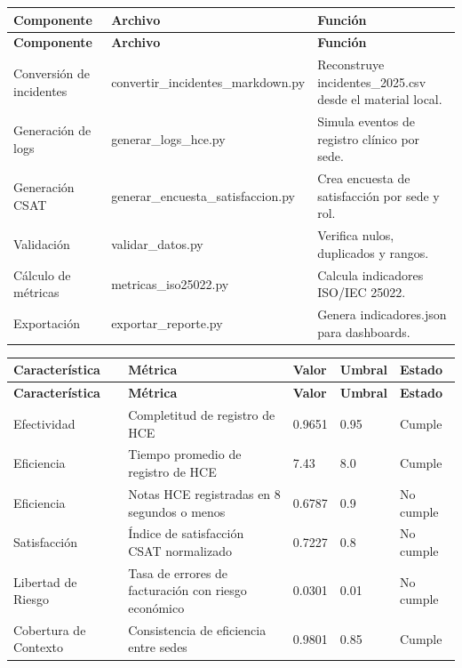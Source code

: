 \documentclass[11pt]{article}
\begin{document}
\small
\begin{longtable}{p{} p{} p{}}
\toprule
\textbf{Componente} & \textbf{Archivo} & \textbf{Función} \\
\midrule
\endfirsthead
\toprule
\textbf{Componente} & \textbf{Archivo} & \textbf{Función} \\
\midrule
\endhead
Conversión de incidentes & convertir\_incidentes\_markdown.py & Reconstruye incidentes\_2025.csv desde el material local. \\
Generación de logs & generar\_logs\_hce.py & Simula eventos de registro clínico por sede. \\
Generación CSAT & generar\_encuesta\_satisfaccion.py & Crea encuesta de satisfacción por sede y rol. \\
Validación & validar\_datos.py & Verifica nulos, duplicados y rangos. \\
Cálculo de métricas & metricas\_iso25022.py & Calcula indicadores ISO/IEC 25022. \\
Exportación & exportar\_reporte.py & Genera indicadores.json para dashboards. \\
\bottomrule
\end{longtable}
\normalsize


\small
\begin{longtable}{p{} p{} p{} p{} p{}}
\toprule
\textbf{Característica} & \textbf{Métrica} & \textbf{Valor} & \textbf{Umbral} & \textbf{Estado} \\
\midrule
\endfirsthead
\toprule
\textbf{Característica} & \textbf{Métrica} & \textbf{Valor} & \textbf{Umbral} & \textbf{Estado} \\
\midrule
\endhead
Efectividad & Completitud de registro de HCE & 0.9651 & 0.95 & Cumple \\
Eficiencia & Tiempo promedio de registro de HCE & 7.43 & 8.0 & Cumple \\
Eficiencia & Notas HCE registradas en 8 segundos o menos & 0.6787 & 0.9 & No cumple \\
Satisfacción & Índice de satisfacción CSAT normalizado & 0.7227 & 0.8 & No cumple \\
Libertad de Riesgo & Tasa de errores de facturación con riesgo económico & 0.0301 & 0.01 & No cumple \\
Cobertura de Contexto & Consistencia de eficiencia entre sedes & 0.9801 & 0.85 & Cumple \\
\bottomrule
\end{longtable}
\normalsize
\end{document}
